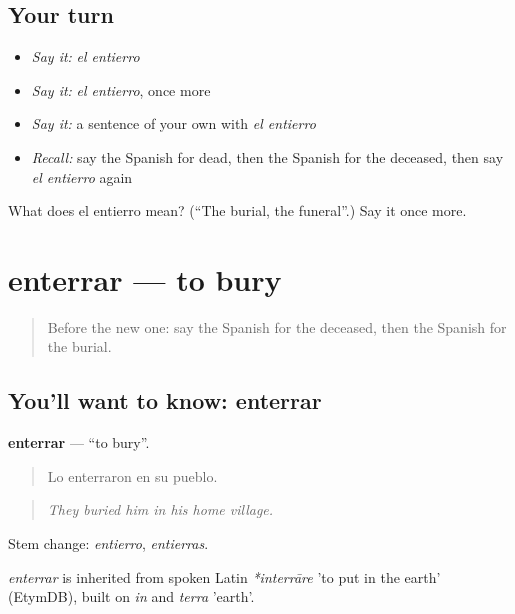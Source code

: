 \subsection*{Your turn}
\begin{itemize}
\raggedright
  \item \emph{Say it:} \emph{el entierro}
  \item \emph{Say it:} \emph{el entierro}, once more
  \item \emph{Say it:} a sentence of your own with \emph{el entierro}
  \item \emph{Recall:} say the Spanish for dead, then the Spanish for the deceased, then say \emph{el entierro} again
\end{itemize}

\begin{tcolorbox}[breakable,colback=teal!4,colframe=teal!35!black,title={Before you move on}]
What does el entierro mean? (\textquotedblleft{}The burial, the funeral\textquotedblright{}.) Say it once more.
\end{tcolorbox}
\section[enterrar]{enterrar — to bury}

\label{lesson:ES-C556-enterrar}



\begin{quote}
Before the new one: say the Spanish for the deceased, then the Spanish for the burial.
\end{quote}

\subsection*{You'll want to know: enterrar}
\textbf{enterrar} — \textquotedblleft{}to bury\textquotedblright{}.

\begin{quote}
Lo enterraron en su pueblo.
\end{quote}

\begin{quote}
\emph{They buried him in his home village.}
\end{quote}

Stem change: \emph{entierro}, \emph{entierras}.

\begin{cousinweb}
\emph{enterrar} is inherited from spoken Latin \emph{*interrāre} 'to put in the earth' (EtymDB), built on \emph{in} and \emph{terra} 'earth'.
\end{cousinweb}

